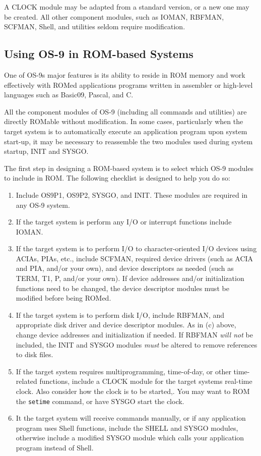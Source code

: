 \documentclass[
]{article}
\begin{document}
A CLOCK module may be adapted from a standard version, or a new one may
be created. All other component modules, such as IOMAN, RBFMAN, SCFMAN,
Shell, and utilities seldom require modification.

\subsection{Using OS-9 in ROM-based Systems}

One of OS-9\textquotesingle s major features is its ability to reside in
ROM memory and work effectively with ROMed applications programs written
in assembler or high-level languages such as Basic09, Pascal, and C.

All the component modules of OS-9 (including all commands and utilities)
are directly ROMable without modification. In some cases, particularly
when the target system is to automatically execute an application
program upon system start-up, it may be necessary to reassemble the two
modules used during system startup, INIT and SYSGO.

The first step in designing a ROM-based system is to select which OS-9
modules to include in ROM. The following checklist is designed to help
you do so:

\begin{enumerate}
\def\labelenumi{\alph{enumi}.}
\item
  Include OS9P1, OS9P2, SYSGO, and INIT. These modules are required in
  any OS-9 system.
\item
  If the target system is perform any I/O or interrupt functions include
  IOMAN.
\item
  If the target system is to perform I/O to character-oriented I/O
  devices using ACIAs, PIAs, etc., include SCFMAN, required device
  drivers (such as ACIA and PIA, and/or your own), and device
  descriptors as needed (such as TERM, T1, P, and/or your own). If
  device addresses and/or initialization functions need to be changed,
  the device descriptor modules must be modified before being ROMed.
\item
  If the target system is to perform disk I/O, include RBFMAN, and
  appropriate disk driver and device descriptor modules. As in (c)
  above, change device addresses and initialization if needed. If RBFMAN
  \emph{will not} be included, the INIT and SYSGO modules \emph{must} be
  altered to remove references to disk files.
\item
  If the target system requires multiprogramming, time-of-day, or other
  time-related functions, include a CLOCK module for the target
  system\textquotesingle s real-time clock. Also consider how the clock
  is to be started,. You may want to ROM the \texttt{setime} command, or
  have SYSGO start the clock.
\item
  It the target system will receive commands manually, or if any
  application program uses Shell functions, include the SHELL and SYSGO
  modules, otherwise include a modified SYSGO module which calls your
  application program instead of Shell.
\end{enumerate}
\end{document}
